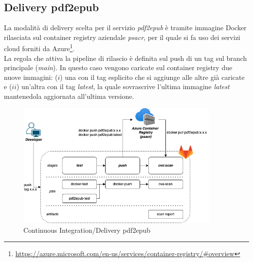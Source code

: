 \subsection{Delivery pdf2epub}
La modalità di delivery scelta per il servizio \textit{pdf2epub} è tramite immagine Docker rilasciata sul container registry aziendale \textit{psacr}, per il quale si fa uso dei servizi cloud forniti da Azure\footnote{\url{https://azure.microsoft.com/en-us/services/container-registry/\#overview}}.\\
La regola che attiva la pipeline di rilascio è definita sul push di un tag sul branch principale (\textit{main}). In questo caso vengono caricate sul container registry due nuove immagini: ($i$) una con il tag esplicito che si aggiunge alle altre già caricate e ($ii$) un'altra con il tag \textit{latest}, la quale sovrascrive l'ultima immagine \textit{latest} mantenedola aggiornata all'ultima versione.
\begin{figure}[H]
\centering
\includegraphics[width=0.9\textwidth]{img/tesi-6-pdf2html.drawio.png}
\caption{Continuous Integration/Delivery pdf2epub}
\end{figure}
